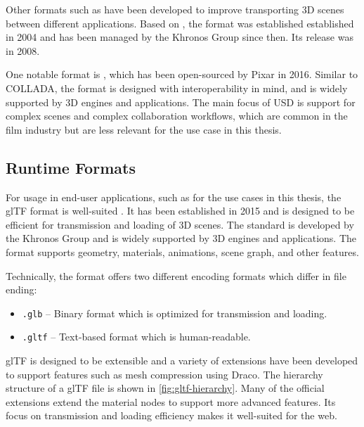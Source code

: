 Other formats such as  have been developed to improve transporting 3D scenes between different applications. Based on , the format was established established in 2004 and has been managed by the \gls{Khronos Group} since then. Its release was in 2008.

One notable format is , which has been open-sourced by Pixar in 2016. Similar to \gls{COLLADA}, the format is designed with interoperability in mind, and is widely supported by 3D engines and applications. The main focus of \gls{USD} is support for complex scenes and complex collaboration workflows, which are common in the film industry but are less relevant for the use case in this thesis.

\subsection*{Runtime Formats}

For usage in end-user applications, such as for the use cases in this thesis, the \gls{glTF} format is well-suited \cite{gltfSpecification}. It has been established in 2015 and is designed to be efficient for transmission and loading of 3D scenes. The standard is developed by the \gls{Khronos Group} and is widely supported by 3D engines and applications. The format supports geometry, materials, animations, scene graph, and other features.

Technically, the format offers two different encoding formats which differ in file ending:

\begin{itemize}
    \item{\texttt{.glb}} – Binary format which is optimized for transmission and loading.
    \item{\texttt{.gltf}} – Text-based format which is human-readable.
\end{itemize}

\gls{glTF} is designed to be extensible and a variety of extensions have been developed to support features such as mesh compression using Draco. The hierarchy structure of a \gls{glTF} file is shown in \autoref{fig:gltf-hierarchy}. Many of the official extensions extend the material nodes to support more advanced features. Its focus on transmission and loading efficiency makes it well-suited for the web.

